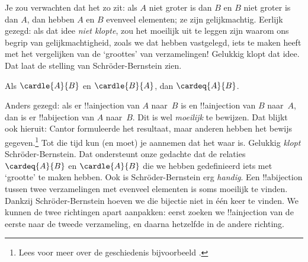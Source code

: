 \documentclass[../../../include/open-logic-section]{subfiles}
\begin{document}
\begin{explain}
Je zou verwachten dat het zo zit: als $A$ niet groter is dan $B$ en $B$
niet groter is dan $A$, dan hebben $A$ en $B$ evenveel elementen; ze
zijn gelijkmachtig. Eerlijk gezegd: als dat idee \emph{niet klopte},
zou het moeilijk uit te leggen zijn waarom ons begrip van
gelijkmachtigheid, zoals we dat hebben vastgelegd, iets te maken heeft
met het vergelijken van de ‘groottes’ van verzamelingen!{} Gelukkig
klopt dat idee. Dat laat de stelling van Schr\"oder-Bernstein zien.
\end{explain}
\begin{thm}
	Als $\cardle{A}{B}$ en $\cardle{B}{A}$,
	dan $\cardeq{A}{B}$.
\end{thm}
\begin{explain}
Anders gezegd: als er !!a{injection} van $A$ naar~$B$ is en
!!a{injection} van $B$ naar~$A$, dan is er !!a{bijection} van $A$
naar~$B$.
Dit is wel \emph{moeilijk} te bewijzen. Dat blijkt ook hieruit: Cantor
formuleerde het resultaat, maar anderen hebben het bewijs
gegeven.\footnote{Lees voor meer over de geschiedenis bijvoorbeeld
\citet[pp.~165--6]{Potter2004}.}
%
Tot die tijd kun (en moet) je aannemen dat het waar is.
Gelukkig \emph{klopt} Schr\"oder-Bernstein. Dat ondersteunt onze gedachte
dat de relaties $\cardeq{A}{B}$ en $\cardle{A}{B}$ die we hebben
gedefinieerd iets met ‘grootte’ te maken hebben. Ook is
Schr\"oder-Bernstein erg \emph{handig}.
Een !!a{bijection} tussen twee verzamelingen met evenveel elementen is
soms moeilijk te vinden. Dankzij Schr\"oder-Bernstein hoeven we die
bijectie niet in één keer te vinden. We kunnen de twee richtingen apart
aanpakken: eerst zoeken we !!a{injection} van de eerste naar de tweede
verzameling, en daarna hetzelfde in de andere richting.
\end{explain}
\end{document}
